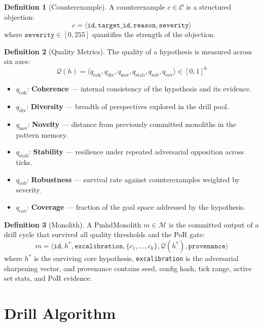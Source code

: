\documentclass[11pt,a4paper,twoside]{article}
\theoremstyle{definition}
\newtheorem{definition}{Definition}[section]
\theoremstyle{plain}
\theoremstyle{remark}
\newcommand{\calC}{\mathcal{C}}
\newcommand{\calQ}{\mathcal{Q}}
\newcommand{\calM}{\mathcal{M}}
\begin{document}
\begin{definition}[Counterexample]\label{def:counterexample}
A counterexample $c \in \calC$ is a structured objection:
\[
  c = \langle \mathtt{id}, \mathtt{target\_id}, \mathtt{reason},
      \mathtt{severity} \rangle
\]
where $\mathtt{severity} \in [0, 255]$ quantifies the strength of the
objection.
\end{definition}

\begin{definition}[Quality Metrics]\label{def:quality}
The quality of a hypothesis is measured across six axes:
\[
  \calQ(h) = \langle q_{\mathrm{coh}}, q_{\mathrm{div}},
  q_{\mathrm{nov}}, q_{\mathrm{stab}}, q_{\mathrm{rob}},
  q_{\mathrm{cov}} \rangle \in [0,1]^6
\]
\begin{itemize}[nosep]
  \item $q_{\mathrm{coh}}$: \textbf{Coherence} --- internal consistency
        of the hypothesis and its evidence.
  \item $q_{\mathrm{div}}$: \textbf{Diversity} --- breadth of
        perspectives explored in the drill pool.
  \item $q_{\mathrm{nov}}$: \textbf{Novelty} --- distance from
        previously committed monoliths in the pattern memory.
  \item $q_{\mathrm{stab}}$: \textbf{Stability} --- resilience under
        repeated adversarial opposition across ticks.
  \item $q_{\mathrm{rob}}$: \textbf{Robustness} --- survival rate
        against counterexamples weighted by severity.
  \item $q_{\mathrm{cov}}$: \textbf{Coverage} --- fraction of the
        goal space addressed by the hypothesis.
\end{itemize}
\end{definition}

\begin{definition}[Monolith]\label{def:monolith}
A PmhdMonolith $m \in \calM$ is the committed output of a drill cycle
that survived all quality thresholds and the PoR gate:
\[
  m = \langle \mathtt{id}, h^*, \mathtt{excalibration},
      \{c_1, \ldots, c_k\}, \calQ(h^*), \mathtt{provenance} \rangle
\]
where $h^*$ is the surviving core hypothesis, \texttt{excalibration}
is the adversarial sharpening vector, and provenance contains seed,
config hash, tick range, active set stats, and PoR evidence.
\end{definition}


\section{Drill Algorithm}\label{sec:pmhd:algo}
\end{document}

